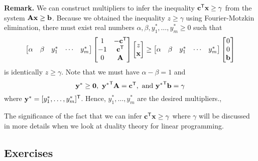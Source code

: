 \textbf{Remark.} We can construct multipliers to infer the inequality
\(\mathbf{c}^{\mathsf{T}} \mathbf{x} \geq \gamma\) from the system
\(\mathbf{A}\mathbf{x} \geq \mathbf{b}\). Because we obtained the inequality
\(z \geq \gamma\) using Fourier-Motzkin elimination, there must exist
real numbers \(\alpha, \beta, y^*_1,\ldots, y^*_m\geq 0\) such that \[
\begin{bmatrix}\alpha & \beta & y^*_1 & \cdots &y^*_m\end{bmatrix}
\begin{bmatrix}
1 & -\mathbf{c}^{\mathsf{T}}  \\
-1 & \mathbf{c}^{\mathsf{T}}  \\
0 & \mathbf{A}
\end{bmatrix}
\begin{bmatrix} z \\ \mathbf{x} \end{bmatrix}
\geq
\begin{bmatrix}\alpha & \beta & y^*_1 & \cdots &y^*_m\end{bmatrix}
\begin{bmatrix} 0 \\ 0\\ \mathbf{b} \end{bmatrix}
\] is identically \(z \geq \gamma\). Note that we must have
\(\alpha-\beta = 1\) and
\[\mathbf{y}^* \geq \mathbf{0},~{\mathbf{y}^*}^{\mathsf{T}} \mathbf{A}
= \mathbf{c}^{\mathsf{T}} ,~\mbox{and }
{\mathbf{y}^*}^{\mathsf{T}} \mathbf{b} = \gamma\] where
\(\mathbf{y}^* = [y^*_1,\ldots,y^*_m]^{\mathsf{T}} \). Hence,
\(y^*_1,\ldots,y^*_m\) are the desired multipliers.,

The significance of the fact that we can infer
\(\mathbf{c}^{\mathsf{T}} \mathbf{x} \geq \gamma\) where \(\gamma\) will be discussed in
more details when we look at duality theory for linear programming.

\subsection*{Exercises}\label{exercises-5}

